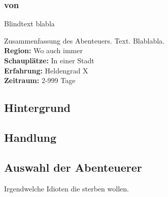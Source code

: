 \documentclass[12pt, a4paper, twoside, openany]{book}
\begin{document}
\begin{multicols}{2}
        \subsubsection*{von \MyAuthor}
        Blindtext blabla
        \begin{spmbox}
                {\begin{center}
                    \color{spmblue}
                    \Large
                    \textbf{\MyTitle}
                \end{center}}
             Zusammenfassung des Abenteuers. Text. Blablabla. \\
                \textbf{Region:} Wo auch immer\\
                \textbf{Schauplätze:} In einer Stadt\\
                \textbf{Erfahrung:} Heldengrad X\\
                \textbf{Zeitraum:} 2-999 Tage\\
        \end{spmbox}
        \subsection*{Hintergrund}
            \Blindtext[1][1]
        \subsection*{Handlung}
            \Blindtext[1][1]
        \subsection*{Auswahl der Abenteuerer}
            Irgendwelche Idioten die sterben wollen.             
\end{multicols}
\end{document}

